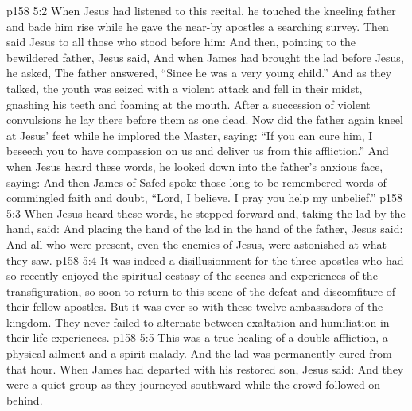 \vs p158 5:2 When Jesus had listened to this recital, he touched the kneeling father and bade him rise while he gave the near\hyp{}by apostles a searching survey. Then said Jesus to all those who stood before him:  And then, pointing to the bewildered father, Jesus said,  And when James had brought the lad before Jesus, he asked,  The father answered, “Since he was a very young child.” And as they talked, the youth was seized with a violent attack and fell in their midst, gnashing his teeth and foaming at the mouth. After a succession of violent convulsions he lay there before them as one dead. Now did the father again kneel at Jesus’ feet while he implored the Master, saying: “If you can cure him, I beseech you to have compassion on us and deliver us from this affliction.” And when Jesus heard these words, he looked down into the father’s anxious face, saying:  And then James of Safed spoke those long\hyp{}to\hyp{}be\hyp{}remembered words of commingled faith and doubt, “Lord, I believe. I pray you help my unbelief.”
\vs p158 5:3 When Jesus heard these words, he stepped forward and, taking the lad by the hand, said:  And placing the hand of the lad in the hand of the father, Jesus said:  And all who were present, even the enemies of Jesus, were astonished at what they saw.
\vs p158 5:4 It was indeed a disillusionment for the three apostles who had so recently enjoyed the spiritual ecstasy of the scenes and experiences of the transfiguration, so soon to return to this scene of the defeat and discomfiture of their fellow apostles. But it was ever so with these twelve ambassadors of the kingdom. They never failed to alternate between exaltation and humiliation in their life experiences.
\vs p158 5:5 This was a true healing of a double affliction, a physical ailment and a spirit malady. And the lad was permanently cured from that hour. When James had departed with his restored son, Jesus said:  And they were a quiet group as they journeyed southward while the crowd followed on behind.
